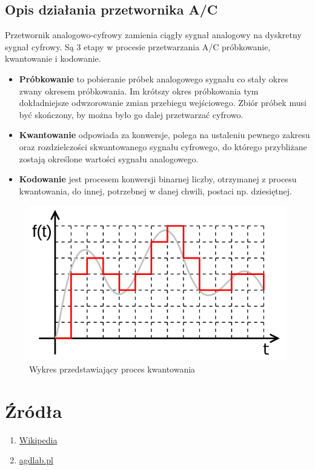 \documentclass[polish,a4paper]{article}
\begin{document}
	\subsection{Opis działania przetwornika A/C}
	 Przetwornik analogowo-cyfrowy zamienia ciągły sygnał analogowy na dyskretny sygnał cyfrowy.
	Są 3 etapy w procesie przetwarzania A/C próbkowanie, kwantowanie i kodowanie. 
	\begin{itemize}
		\item \textbf{Próbkowanie} to pobieranie próbek analogowego sygnału co stały okres zwany okresem próbkowania. Im krótszy okres próbkowania tym dokładniejsze odwzorowanie zmian przebiegu wejściowego. Zbiór próbek musi być skończony, by można było go dalej przetwarzać cyfrowo.
		\item \textbf{Kwantowanie} odpowiada za konwersje, polega na ustaleniu pewnego zakresu oraz rozdzielczości skwantowanego sygnału cyfrowego, do którego przybliżane zostają określone wartości sygnału analogowego.
		\item \textbf{Kodowanie} jest procesem konwersji binarnej liczby, otrzymanej z procesu kwantowania, do innej, potrzebnej w danej chwili, postaci np. dziesiętnej.
	\end{itemize}
	
	\begin{figure}[h!]
		\begin{center}
			\includegraphics[scale=0.45]{Quant.png}
			\caption*{Wykres przedstawiający proces kwantowania}
		\end{center}
	\end{figure}
	
	\section*{Źródła}
	\begin{enumerate}
		\item \href{https://pl.wikipedia.org/}{Wikipedia}
		\item \href{https://agdlab.pl/slownik/Kwantowanie,171}{agdlab.pl} 
	\end{enumerate}
	\begingroup
	\hypersetup{hidelinks}
	\tableofcontents
	\endgroup
\end{document}
